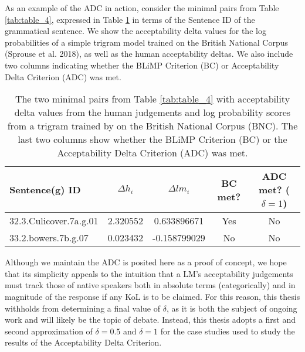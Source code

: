 As an example of the ADC in action, consider the minimal pairs from Table \ref{tab:table_4}, expressed in Table \ref{tab:table_5} in terms of the Sentence ID of the grammatical sentence.  We show the acceptability delta values for the log probabilities of a simple trigram model trained on the British National Corpus (Sprouse et al. 2018), as well as the human acceptability deltas. We also include two columns indicating whether the BLiMP Criterion (BC) or Acceptability Delta Criterion (ADC) was met.
\begin{table}[h]
    \centering
    \begin{tabular}{lcccc}
    \toprule
    \textbf{Sentence(g) ID} & \textbf{$\Delta h_i$} & \textbf{$\Delta lm_i$} & \textbf{BC met?} & \textbf{ADC met? ($\delta = 1$)}\\
    \midrule
    32.3.Culicover.7a.g.01 & 2.320552 & 0.633896671 & Yes & No \\
    33.2.bowers.7b.g.07 & 0.023432 & -0.158799029 & No & No\\
    \bottomrule
    \end{tabular}
    \caption[Example of the Acceptability Delta Criterion (ADC)]{The two minimal pairs from Table \ref{tab:table_4} with acceptability delta values from the human judgements and log probability scores from a trigram trained by \citet{sprouse2018colorless} on the British National Corpus (BNC).  The last two columns show whether the BLiMP Criterion (BC) or the Acceptability Delta Criterion (ADC) was met.}
    \label{tab:table_5}
\end{table}

Although we maintain the ADC is posited here as a proof of concept, we hope that its simplicity appeals to the intuition that a LM's acceptability judgements must track those of native speakers both in absolute terms (categorically) and in magnitude of the response if any KoL is to be claimed.  For this reason, this thesis withholds from determining a final value of $\delta$, as it is both the subject of ongoing work and will likely be the topic of debate. Instead, this thesis adopts a first and second approximation of $\delta = 0.5$ and $\delta = 1$ for the case studies used to study the results of the Acceptability Delta Criterion. %
